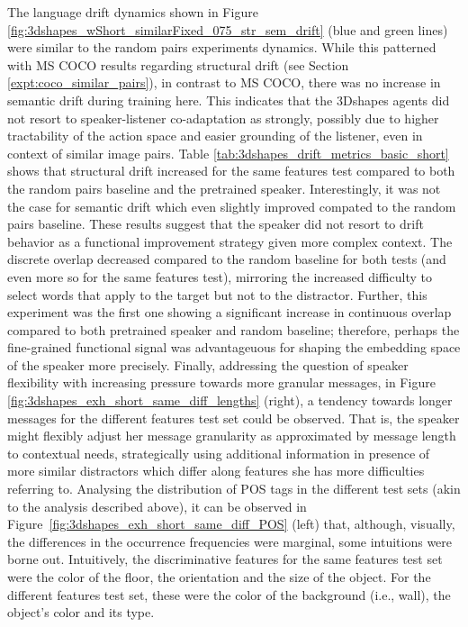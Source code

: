 The language drift dynamics shown in Figure \ref{fig:3dshapes_wShort_similarFixed_075_str_sem_drift} (blue and green lines) were similar to the random pairs experiments dynamics. While this patterned with MS COCO results regarding structural drift (see Section \ref{expt:coco_similar_pairs}), in contrast to MS COCO, there was no increase in semantic drift during training here. This indicates that the 3Dshapes agents did not resort to speaker-listener co-adaptation as strongly, possibly due to higher tractability of the action space and easier grounding of the listener, even in context of similar image pairs.
Table \ref{tab:3dshapes_drift_metrics_basic_short} shows that structural drift increased for the same features test compared to both the random pairs baseline and the pretrained speaker. Interestingly, it was not the case for semantic drift which even slightly improved compated to the random pairs baseline. These results suggest that the speaker did not resort to drift behavior as a functional improvement strategy given more complex context. The discrete overlap decreased compared to the random baseline for both tests (and even more so for the same features test), mirroring the increased difficulty to select words that apply to the target but not to the distractor. Further, this experiment was the first one showing a significant increase in continuous overlap compared to both pretrained speaker and random baseline; therefore, perhaps the fine-grained functional signal was advantageuous for shaping the embedding space of the speaker more precisely. Finally, addressing the question of speaker flexibility with increasing pressure towards more granular messages, in Figure \ref{fig:3dshapes_exh_short_same_diff_lengths} (right), a tendency towards longer messages for the different features test set could be observed. That is, the speaker might flexibly adjust her message granularity as approximated by message length to contextual needs, strategically using additional information in presence of more similar distractors which differ along features she has more difficulties referring to. %
Analysing the distribution of POS tags in the different test sets (akin to the analysis described above), it can be observed in Figure~\ref{fig:3dshapes_exh_short_same_diff_POS} (left) that, although, visually, the differences in the occurrence frequencies were marginal, some intuitions were borne out. Intuitively, the discriminative features for the same features test set were the color of the floor, the orientation and the size of the object. For the different features test set, these were the color of the background (i.e., wall), the object's color and its type.
